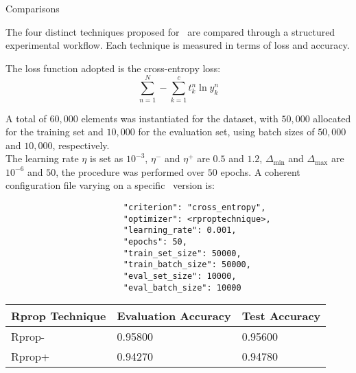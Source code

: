 \begin{section}{Comparisons}
    \par The four distinct techniques proposed for~ are compared through a structured experimental workflow. Each technique is measured in terms of loss and accuracy.
    \par The loss function adopted is the cross-entropy loss:
    \[
        \sum_{n=1}^{N} - \sum_{k=1}^{c} t_{k}^{n} \ln y_{k}^{n}
    \]
    \par A total of $60,000$ elements was instantiated for the dataset, with $50,000$ allocated for the training set and $10,000$ for the evaluation set, using batch sizes of $50,000$ and $10,000$, respectively.\\
    The learning rate $\eta$ is set as $10^{-3}$, $\eta^{-}$ and $\eta^{+}$ are $0.5$ and $1.2$, $\Delta_{\min}$ and $\Delta_{\max}$ are $10^{-6}$ and $50$, the procedure was performed over $50$ epochs. A coherent configuration file varying on a specific~ version is:\\
    \begin{verbatim}
                        "criterion": "cross_entropy",
                        "optimizer": <rproptechnique>,
                        "learning_rate": 0.001,
                        "epochs": 50,
                        "train_set_size": 50000,
                        "train_batch_size": 50000,
                        "eval_set_size": 10000,
                        "eval_batch_size": 10000
    \end{verbatim}
    \clearpage
    
    
    \clearpage
    \begin{table}[htp]
        \centering
        \begin{tabular}{|p{4.3cm}|p{4.3cm}|p{4.3cm}|}
            \hline
            \multicolumn{1}{|c|}{\textbf{Rprop Technique}} & \multicolumn{1}{c|}{\textbf{Evaluation Accuracy}} & \multicolumn{1}{c|}{\textbf{Test Accuracy}} \\ \hline
            \hspace{1.5cm} Rprop-                  & \hspace{1.5cm} 0.95800 \hfill               & \hspace{1.5cm} 0.95600 \hfill                    \\
            \hspace{1.5cm} Rprop+                   & \hspace{1.5cm} 0.94270 \hfill               & \hspace{1.5cm} 0.94780 \hfill                    \\

\end{tabular}
\end{table}
\end{section}
